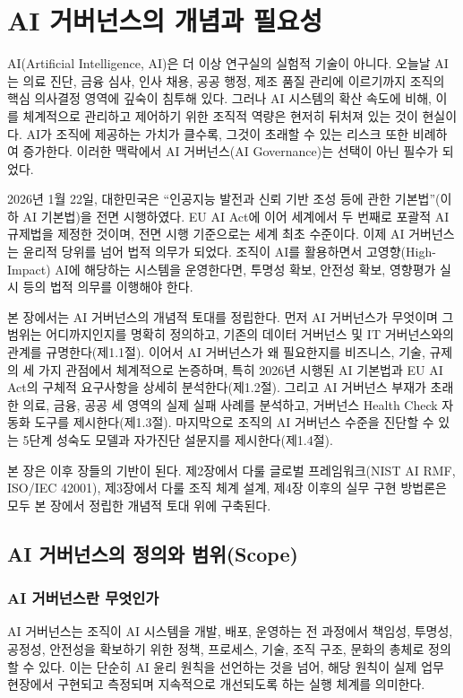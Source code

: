 \chapter{AI 거버넌스의 개념과 필요성}

AI(Artificial Intelligence, AI)은 더 이상 연구실의 실험적 기술이 아니다. 오늘날 AI는 의료 진단, 금융 심사, 인사 채용, 공공 행정, 제조 품질 관리에 이르기까지 조직의 핵심 의사결정 영역에 깊숙이 침투해 있다. 그러나 AI 시스템의 확산 속도에 비해, 이를 체계적으로 관리하고 제어하기 위한 조직적 역량은 현저히 뒤처져 있는 것이 현실이다. AI가 조직에 제공하는 가치가 클수록, 그것이 초래할 수 있는 리스크 또한 비례하여 증가한다. 이러한 맥락에서 AI 거버넌스(AI Governance)는 선택이 아닌 필수가 되었다.

2026년 1월 22일, 대한민국은 ``인공지능 발전과 신뢰 기반 조성 등에 관한 기본법''(이하 AI 기본법)을 전면 시행하였다.\cite{cset2025korea_ai_act} EU AI Act에 이어 세계에서 두 번째로 포괄적 AI 규제법을 제정한 것이며, 전면 시행 기준으로는 세계 최초 수준이다. 이제 AI 거버넌스는 윤리적 당위를 넘어 법적 의무가 되었다. 조직이 AI를 활용하면서 고영향(High-Impact) AI에 해당하는 시스템을 운영한다면, 투명성 확보, 안전성 확보, 영향평가 실시 등의 법적 의무를 이행해야 한다.

본 장에서는 AI 거버넌스의 개념적 토대를 정립한다. 먼저 AI 거버넌스가 무엇이며 그 범위는 어디까지인지를 명확히 정의하고, 기존의 데이터 거버넌스 및 IT 거버넌스와의 관계를 규명한다(제1.1절). 이어서 AI 거버넌스가 왜 필요한지를 비즈니스, 기술, 규제의 세 가지 관점에서 체계적으로 논증하며, 특히 2026년 시행된 AI 기본법과 EU AI Act의 구체적 요구사항을 상세히 분석한다(제1.2절). 그리고 AI 거버넌스 부재가 초래한 의료, 금융, 공공 세 영역의 실제 실패 사례를 분석하고, 거버넌스 Health Check 자동화 도구를 제시한다(제1.3절). 마지막으로 조직의 AI 거버넌스 수준을 진단할 수 있는 5단계 성숙도 모델과 자가진단 설문지를 제시한다(제1.4절).

본 장은 이후 장들의 기반이 된다. 제2장에서 다룰 글로벌 프레임워크(NIST AI RMF, ISO/IEC 42001), 제3장에서 다룰 조직 체계 설계, 제4장 이후의 실무 구현 방법론은 모두 본 장에서 정립한 개념적 토대 위에 구축된다.

\section{AI 거버넌스의 정의와 범위(Scope)}

\subsection{AI 거버넌스란 무엇인가}
AI 거버넌스는 조직이 AI 시스템을 개발, 배포, 운영하는 전 과정에서 책임성, 투명성, 공정성, 안전성을 확보하기 위한 정책, 프로세스, 기술, 조직 구조, 문화의 총체로 정의할 수 있다.\cite{gasser2017layered, cath2018governing} 이는 단순히 AI 윤리 원칙을 선언하는 것을 넘어, 해당 원칙이 실제 업무 현장에서 구현되고 측정되며 지속적으로 개선되도록 하는 실행 체계를 의미한다.\cite{dignum2019responsible}


